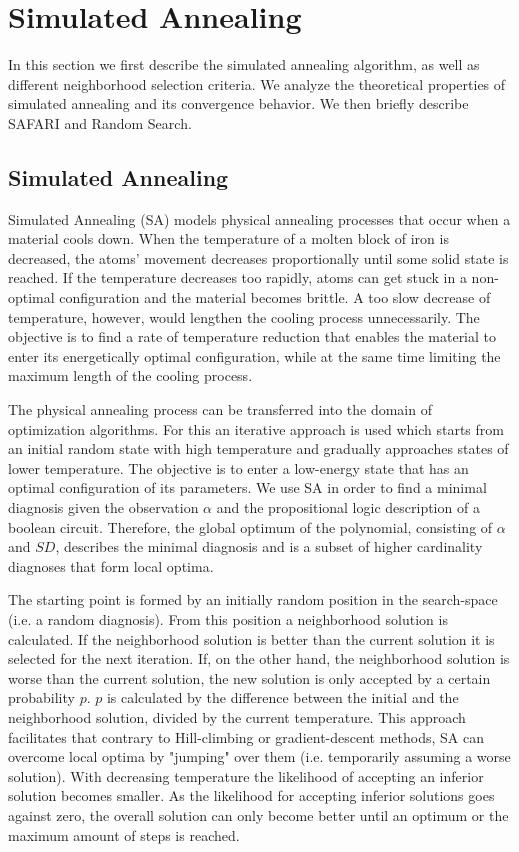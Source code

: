 \documentclass{article}
\begin{document}
\section{Simulated Annealing}
In this section we first describe the simulated annealing algorithm,
as well as different neighborhood selection criteria. We analyze the
theoretical properties of simulated annealing and its convergence
behavior. We then briefly describe SAFARI and Random Search.
\subsection{Simulated Annealing}
Simulated Annealing (SA) models physical annealing processes that
occur when a material cools down. When the temperature of a molten
block of iron is decreased, the atoms' movement decreases
proportionally until some solid state is reached. If the temperature
decreases too rapidly, atoms can get stuck in a non-optimal
configuration and the material becomes brittle. A too slow decrease of
temperature, however, would lengthen the cooling process
unnecessarily. The objective is to find a rate of temperature
reduction that enables the material to enter its energetically optimal
configuration, while at the same time limiting the maximum length of
the cooling process.

The physical annealing process can be transferred into the domain of
optimization algorithms. For this an iterative approach is used which
starts from an initial random state with high temperature and
gradually approaches states of lower temperature. The objective is to
enter a low-energy state that has an optimal configuration of its
parameters. We use SA in order to find a minimal diagnosis given the
observation $\alpha$ and the propositional logic description of a
boolean circuit. Therefore, the global optimum of the polynomial, consisting of $\alpha$ and $SD$, describes the minimal
diagnosis and is a subset of higher cardinality diagnoses that form
local optima.

The starting point is formed by an initially random position in the
search-space (i.e. a random diagnosis). From this position a
neighborhood solution is calculated. If the neighborhood solution is
better than the current solution it is selected for the next
iteration. If, on the other hand, the neighborhood solution is worse
than the current solution, the new solution is only accepted by a
certain probability $p$. $p$ is calculated by the difference between
the initial and the neighborhood solution, divided by the current
temperature. This approach facilitates that contrary to Hill-climbing
or gradient-descent methods, SA can overcome local optima by "jumping"
over them (i.e. temporarily assuming a worse solution). With
decreasing temperature the likelihood of accepting an inferior
solution becomes smaller. As the likelihood for accepting inferior
solutions goes against zero, the overall solution can only become
better until an optimum or the maximum amount of steps is reached.
\end{document}
